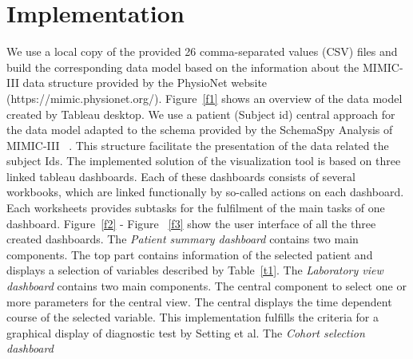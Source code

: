 \documentclass[aac,crcready]{iosart2x}
\begin{document}
\section{Implementation}\label{s4}
%
We use a local copy of the provided 26 comma-separated values (CSV) files and build the corresponding data model based on the information about the MIMIC-III data structure provided by the PhysioNet website (https://mimic.physionet.org/). Figure~\ref{f1} shows an overview of the data model created by Tableau desktop. We use a patient (Subject id) central approach for the data model adapted to the schema provided by the SchemaSpy Analysis of MIMIC-III ~\cite{SchemaSpy.2017}. This structure facilitate the presentation of the data related the subject Ids.   
The implemented solution of the visualization tool is based on three linked tableau dashboards. Each of these dashboards consists of several workbooks, which are linked functionally by so-called actions on each dashboard. Each worksheets provides subtasks for the fulfilment of the main tasks of one dashboard. Figure~\ref{f2} - Figure ~\ref{f3} show the user interface of all the three created dashboards.
The \textit{Patient summary dashboard} contains two main components. The top part contains information of the selected patient and displays a selection of variables described by Table~\ref{t1}.
The \textit{Laboratory view dashboard} contains two main components. The central component to select one or more parameters for the central view. The central displays the time dependent course of the selected variable. This implementation fulfills the criteria for a graphical display of diagnostic test by Setting et al. 
The \textit{Cohort selection dashboard} \lipsum[1-3]
\end{document}
